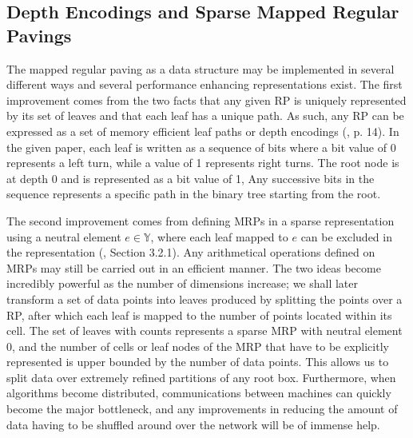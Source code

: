 \documentclass{report}
\begin{document}
\subsection{Depth Encodings and Sparse Mapped Regular Pavings}
The mapped regular paving as a data structure may be implemented in several different ways and several performance enhancing representations exist.
The first improvement comes from the two facts that any given RP is uniquely represented by its set of leaves and that each leaf has a unique path. As such, any RP can be
expressed as a set of memory efficient leaf paths or depth encodings (\cite{Scalable Multivariate Histograms}, p. 14). In the given paper, each leaf is written as a sequence of bits
where a bit value of 0 represents a left turn, while a value of 1 represents right turns.
The root node is at depth 0 and is represented as a bit value of 1, 
Any successive bits in the sequence represents a specific path in the binary tree starting from 
the root. 

The second improvement comes from defining MRPs in a sparse representation using a neutral element $e \in \mathbb{Y}$, where each leaf mapped to $e$ can be excluded in the representation 
(\cite{Scalable Algorithms}, Section 3.2.1). Any arithmetical operations defined on MRPs may still be carried out in an efficient manner.
The two ideas become incredibly powerful as the number of dimensions increase; we shall later transform
a set of data points into leaves produced by splitting the points over a RP, after which each leaf is
mapped to the number of points located within its cell. The set of leaves with counts represents a sparse MRP
with neutral element $0$, and 
the number of cells or leaf nodes of the MRP that have to be explicitly represented is upper 
bounded by the number of data points. This allows us to split data over extremely refined partitions of any root box. Furthermore, when algorithms become distributed,
communications between machines can quickly become the major bottleneck, and any improvements in reducing the amount of data having to be shuffled around over the network will be of immense help.
\end{document}
